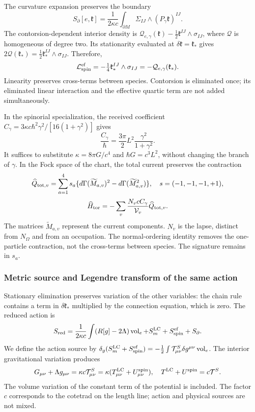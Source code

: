 The curvature expansion preserves the boundary
\[
S_\partial[e,\mathfrak k]=\frac1{2\kappa c}
\int_{\partial M}\Sigma_{IJ}\wedge(P_\gamma\mathfrak k)^{IJ}.
\]
The contorsion-dependent interior density is $\mathcal Q_{e,\gamma}(\mathfrak k)
-\tfrac12\mathfrak k^{IJ}\wedge\sigma_{IJ}$, where $\mathcal Q$ is homogeneous of degree two. Its stationarity evaluated at $\delta\mathfrak k=\mathfrak k_*$ gives $2\mathcal Q(\mathfrak k_*)=
\tfrac12\mathfrak k_*^{IJ}\wedge\sigma_{IJ}$. Therefore,
\begin{equation}
\mathcal L_{\rm spin}^{\rm ef}
=-\tfrac14\mathfrak k_*^{IJ}\wedge\sigma_{IJ}
=-\mathcal Q_{e,\gamma}(\mathfrak k_*).
\label{hmtcuatro:gea:spin}
\end{equation}
Linearity preserves cross-terms between species. Contorsion is eliminated once; its eliminated linear interaction and the effective quartic term are not added simultaneously.

In the spinorial specialization, the received coefficient $C_\gamma=3\kappa c\hbar^2\gamma^2/[16(1+\gamma^2)]$ gives
\begin{equation}
\frac{C_\gamma}{\hbar}
=\frac{3\pi}{2}L^2\frac{\gamma^2}{1+\gamma^2}.
\label{hmtcuatro:gea:coeficiente-torsion}
\end{equation}
It suffices to substitute $\kappa=8\pi G/c^4$ and $\hbar G=c^3L^2$, without changing the branch of $\gamma$. In the Fock space of the chart, the total current preserves the contraction
\[
\widehat Q_{{\rm tot},v}=\sum_{a=1}^4s_a
\{d\Gamma(\widetilde M_{a,v})^2-d\Gamma(\widetilde M_{a,v}^2)\},
\quad s=(-1,-1,-1,+1),
\]
\[
\widehat H_{\rm tor}
=-\sum_v\frac{N_vcC_\gamma}{\mathcal V_v}\widehat Q_{{\rm tot},v}.
\]
The matrices $\widetilde M_{a,v}$ represent the current components. $N_v$ is the lapse, distinct from $N_\Omega$ and from an occupation. The normal-ordering identity removes the one-particle contraction, not the cross-terms between species. The signature remains in $s_a$.

\subsubsection{Metric source and Legendre transform of the same action}
\label{hmtcuatro:gea:legendre}

Stationary elimination preserves variation of the other variables: the chain rule contains a term in $\delta\mathfrak k_*$ multiplied by the connection equation, which is zero. The reduced action is
\[
S_{\rm red}=\frac1{2\kappa c}\int(R[g]-2\Lambda)\operatorname{vol}_e
+S_m^{\rm LC}+S_{\rm spin}^{\rm ef}+S_\partial.
\]
We define the action source by $\delta_g(S_m^{\rm LC}+S_{\rm spin}^{\rm ef})
=-\tfrac12\int\mathcal T^S_{\mu\nu}\delta g^{\mu\nu}
\operatorname{vol}_e$. The interior gravitational variation produces
\begin{equation}
G_{\mu\nu}+\Lambda g_{\mu\nu}
=\kappa c\mathcal T^S_{\mu\nu}
=\kappa(T^{\rm LC}_{\mu\nu}+U^{\rm spin}_{\mu\nu}),
\quad T^{\rm LC}+U^{\rm spin}=c\mathcal T^S.
\label{hmtcuatro:gea:metrica}
\end{equation}
The volume variation of the constant term of the potential is included. The factor $c$ corresponds to the cotetrad on the length line; action and physical sources are not mixed.

